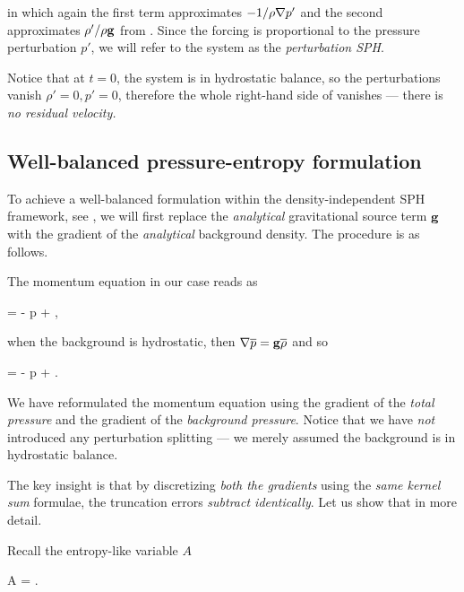 \documentclass[../main.tex]{subfiles}
\begin{document}
in which again the first term approximates $ - 1/\rho \nabla p'$ and the second approximates $\rho'/\rho \mathbf{g}$ from . Since the forcing is proportional to the pressure perturbation $p'$, we will refer to the system  as the \emph{perturbation SPH}.

Notice that at $t = 0$, the system is in hydrostatic balance, so the perturbations vanish $\rho' = 0, p' = 0$, therefore the whole right-hand side of  vanishes --- there is \emph{no residual velocity.}

\subsection{Well-balanced pressure-entropy formulation}
\label{sec:WB-DI-PA}

To achieve a well-balanced formulation within the density-independent SPH framework, see , we will first replace the \emph{analytical} gravitational source term $\mathbf{g}$ with the gradient of the \emph{analytical} background density. The procedure is as follows.

The momentum equation in our case reads as

\begin{equations}[single,*]
	 = -  \grad p + ,
\end{equations}

when the background is hydrostatic, then $\nabla \overline{p} = \mathbf{g} \overline{\rho}$ and so

\begin{equations}[single,!,numberline=all]
	\label{eq:WB-INSPIRATION}
	 = -  \grad p +  \grad {}.
\end{equations}

We have reformulated the momentum equation using the gradient of the \emph{total pressure} and the gradient of the \emph{background pressure}. Notice that we have \emph{not} introduced any perturbation splitting --- we merely assumed the background is in hydrostatic balance.

The key insight is that by discretizing \emph{both the gradients} using the \emph{same kernel sum} formulae, the truncation errors \emph{subtract identically}. Let us show that in more detail.

Recall the entropy-like variable $A$ 

\begin{equations}[single,*]
	A = .
\end{equations}
\end{document}
